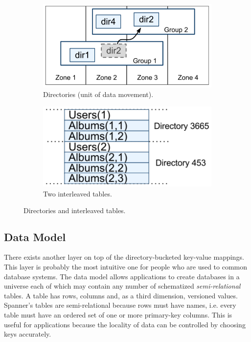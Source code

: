 \documentclass[onecolumn, a4paper, 10pt]{article}
\begin{document}
\begin{figure}[ht]
  \centering
  \begin{subfigure}{0.45\textwidth}
    \includegraphics[width = \textwidth]{figs/directories}
    \caption{Directories (unit of data movement).~\cite{Corbett:2012}}
    \label{subfig:directories}
  \end{subfigure}
  \qquad
  \begin{subfigure}{0.45\textwidth}
    \includegraphics[width = \textwidth]{figs/interleaving-example.png}
    \caption{Two interleaved tables.~\cite{Corbett:2012}}
    \label{subfig:interleaved-tables}
  \end{subfigure}
  \caption{Directories and interleaved tables.}
  \label{fig:directories-and-tables}
\end{figure}

\subsection{Data Model}
\label{subsec:data-model}

There exists another layer on top of the directory-bucketed key-value mappings.
This layer is probably the most intuitive one for people who are used to common
database systems. The data model allows applications to create databases in a
universe each of which may contain any number of schematized
\emph{semi-relational} tables. A table has rows, columns and, as a third
dimension, versioned values. Spanner's tables are semi-relational because rows
must have names, i.e. every table must have an ordered set of one or more
primary-key columns. This is useful for applications because the locality of
data can be controlled by choosing keys accurately.
\end{document}
